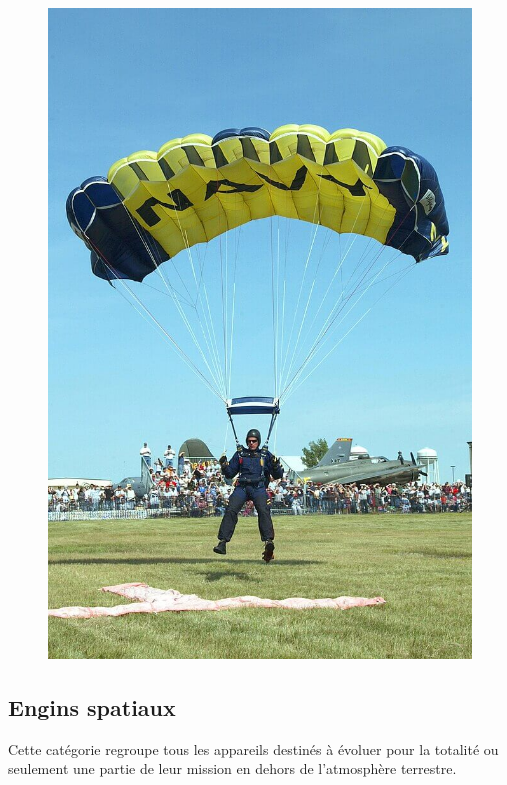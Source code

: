 \begin{figure}[H]
\begin{minipage}[c]{0.35\linewidth}
	\includegraphics[width=\linewidth]{01-EtudeAeronefs/img/paraSport.jpg}
	\end{minipage}
	\end{figure}
	
	
\subsection{Engins spatiaux}
	Cette catégorie regroupe tous les appareils destinés à évoluer pour la totalité ou seulement une partie de leur mission en dehors de l'atmosphère terrestre.
	
